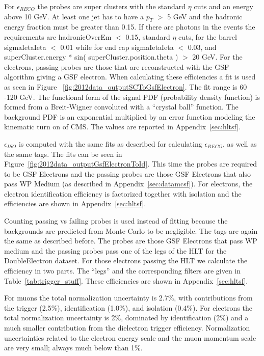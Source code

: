 For $\epsilon_{RECO}$ the probes are super clusters with the standard $\eta$ cuts and an energy above 10 GeV. At least one jet has to have a $p_T$ $>$ 5 GeV and the hadronic energy fraction must be greater than 0.15. If there are photons in the events the requirements are hadronicOverEm $<$ 0.15, standard $\eta$ cuts, for the barrel sigmaIetaIeta $<$ 0.01 while for end cap sigmaIetaIeta $<$ 0.03, and superCluster.energy * sin( superCluster.position.theta ) $>$ 20 GeV. For the electrons, passing probes are those that are reconstructed with the GSF algorithm giving a GSF electron.  When calculating these efficiencies a fit is used as seen in Figure ~\ref{fig:2012data_outputSCToGsfElectron}.  The fit range is 60 -120 GeV. The functional form of the signal PDF (probability density function) is formed from a Breit-Wigner convoluted with a ``crystal ball'' function. The background PDF is an exponential multiplied by an error function modeling the kinematic turn on of CMS. The values are reported in Appendix~\ref{sec:hltsf}.


$\epsilon_{ISO}$ is computed with the same fits as described for calculating $\epsilon_{RECO}$, as well as the same tags. The fits can be seen in Figure~\ref{fig:2012data_outputGsfElectronToId}. This time the probes are required to be GSF Electrons and the passing probes are those GSF Electrons that also pass WP Medium (as described in Appendix~\ref{sec:datamcsf}). For electrons, the electron identification efficiency is factorized together with isolation and the efficiencies are shown in Appendix~\ref{sec:hltsf}.


Counting passing vs failing probes is used instead of fitting because the backgrounds are predicted from Monte Carlo to be negligible. The tags are again the same as described before. The probes are those GSF Electrons that pass WP medium and the passing probes pass one of the legs of the HLT for the DoubleElectron dataset. For those electrons passing the HLT we calculate the efficiency in two parts.  The ``legs'' and the corresponding filters are given in Table~\ref{tab:trigger_stuff}. These efficiencies are shown in Appendix~\ref{sec:hltsf}.

 For muons the total normalization uncertainty is 2.7\%, with contributions from the trigger (2.5\%), identification (1.0\%), and isolation (0.4\%). For electrons the total normalization uncertainty is 2\%, dominated by identification (2\%) and a much smaller contribution from the dielectron trigger efficiency. Normalization uncertainties related to the electron energy scale and the muon momentum scale are very small; always much below than 1\%.


